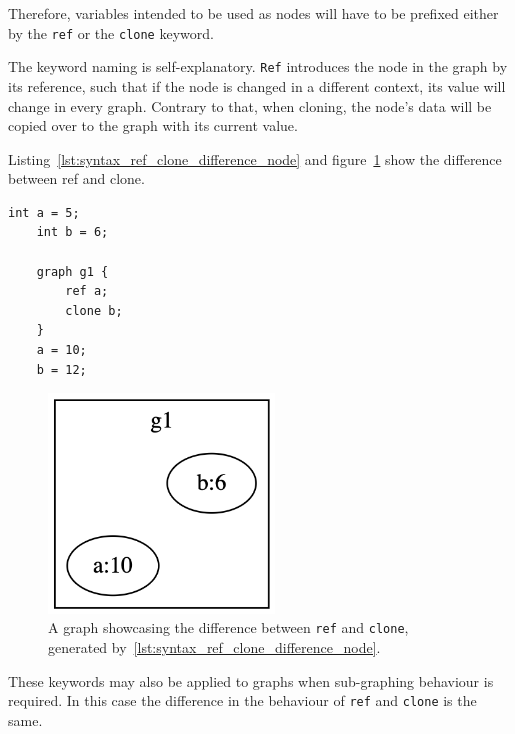 Therefore, variables intended to be used as nodes will have to be prefixed either by the \lstinline{ref}
or the \lstinline{clone} keyword.

The keyword naming is self-explanatory.
\lstinline{Ref} introduces the node in the graph by its reference, such that if
the node is changed in a different context, its value will change in every graph.
Contrary to that, when cloning, the node's data will be copied over to the graph with its current value.

Listing~\ref{lst:syntax_ref_clone_difference_node} and figure~\ref{fig:syntax_ref_vs_clone} show the difference between ref and clone.

\begin{lstlisting}[caption={Example code, showcasing the difference between ref and clone.},captionpos=b,label={lst:syntax_ref_clone_difference_node}]
    int a = 5;
    int b = 6;

    graph g1 {
        ref a;
        clone b;
    }
    a = 10;
    b = 12;
\end{lstlisting}
\begin{figure}[H]
    \centering
    \includegraphics[width=6cm]{figures/syntax_section/syntax_ref_vs_clone}
    \caption{A graph showcasing the difference between \lstinline{ref} and \lstinline{clone}, generated by~\ref{lst:syntax_ref_clone_difference_node}.}
    \label{fig:syntax_ref_vs_clone}
\end{figure}

These keywords may also be applied to graphs when sub-graphing behaviour is required.
In this case the difference in the behaviour of \lstinline{ref} and \lstinline{clone} is the same.

